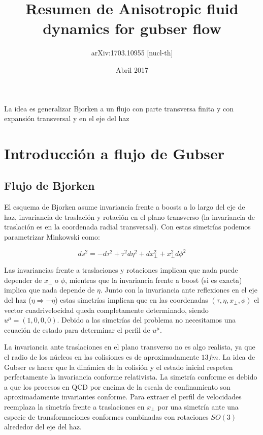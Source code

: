 \documentclass[11pt,a4paper]{article}
\begin{document}
\title{\Huge Resumen de Anisotropic fluid dynamics for gubser flow}
\author{\huge  arXiv:1703.10955 [nucl-th]}





\date{Abril 2017}

\renewcommand{\headrulewidth}{0.5pt}




\maketitle

La idea es generalizar Bjorken a un flujo con parte transversa finita y con expansión transversal y en el eje del haz

\section{Introducción a flujo de Gubser}

\subsection{Flujo de Bjorken}
El esquema de Bjorken asume invariancia frente a boosts a lo largo del eje de haz, invariancia de traslación y rotación en el plano transverso (la invariancia de traslación es en la coordenada radial transversal). Con estas simetrías podemos parametrizar Minkowski como:

\begin{equation}
ds^2=-d{\tau}^2+{\tau}^2d{\eta}^2+dx^{2}_{\bot}+x^{2}_{\bot}d{\phi}^2
\end{equation}

Las invariancias frente a traslaciones y rotaciones implican que nada puede depender de $x_{\bot}$ o ${\phi}$, mientras que la invariancia frente a boost (si es exacta) implica que nada depende de $\eta$. Junto con la invariancia ante reflexiones en el eje del haz ($\eta\Rightarrow-\eta$) estas simetrías implican que en las coordenadas $(\tau,\eta,x_{\bot},\phi)$ el vector cuadrivelocidad queda completamente determinado, siendo $u^{\mu}=(1,0,0,0)$. Debido a las simetrías del problema no necesitamos una ecuación de estado para determinar el perfil de $u^{\mu}$.

La invariancia ante traslaciones en el plano transverso no es algo realista, ya que el radio de los núcleos en las colisiones es de aproximadamente $13 fm$. La idea de Gubser es hacer que la dinámica de la colisión y el estado inicial respeten perfectamente la invariancia conforme relativista. La simetría conforme es debido a que los procesos en QCD por encima de la escala de confinamiento son aproximadamente invariantes conforme. Para extraer el perfil de velocidades reemplaza la simetría frente a traslaciones en $x_{\bot}$ por una simetría ante una especie de transformaciones conformes combinadas con rotaciones $SO(3)$ alrededor del eje del haz.
\end{document}
